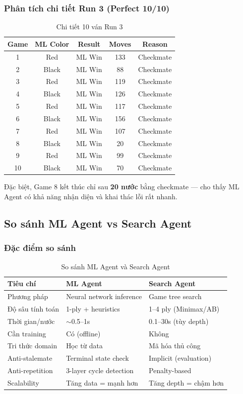 \subsubsection{Phân tích chi tiết Run 3 (Perfect 10/10)}
\begin{table}[H]
\centering
\caption{Chi tiết 10 ván Run 3}
\begin{tabular}{ccccc}
\toprule
\textbf{Game} & \textbf{ML Color} & \textbf{Result} & \textbf{Moves} & \textbf{Reason} \\
\midrule
1 & Red & ML Win & 133 & Checkmate \\
2 & Black & ML Win & 88 & Checkmate \\
3 & Red & ML Win & 119 & Checkmate \\
4 & Black & ML Win & 126 & Checkmate \\
5 & Red & ML Win & 117 & Checkmate \\
6 & Black & ML Win & 156 & Checkmate \\
7 & Red & ML Win & 107 & Checkmate \\
8 & Black & ML Win & 20 & Checkmate \\
9 & Red & ML Win & 99 & Checkmate \\
10 & Black & ML Win & 70 & Checkmate \\
\bottomrule
\end{tabular}
\end{table}

Đặc biệt, Game 8 kết thúc chỉ sau \textbf{20 nước} bằng checkmate --- cho thấy ML Agent có khả năng nhận diện và khai thác lỗi rất nhanh.

\subsection{So sánh ML Agent vs Search Agent}

\subsubsection{Đặc điểm so sánh}
\begin{table}[H]
\centering
\caption{So sánh ML Agent và Search Agent}
\begin{tabularx}{\textwidth}{lXX}
\toprule
\textbf{Tiêu chí} & \textbf{ML Agent} & \textbf{Search Agent} \\
\midrule
Phương pháp & Neural network inference & Game tree search \\
Độ sâu tính toán & 1-ply + heuristics & 1--4 ply (Minimax/AB) \\
Thời gian/nước & $\sim$0.5--1s & 0.1--30s (tùy depth) \\
Cần training & Có (offline) & Không \\
Tri thức domain & Học từ data & Mã hóa thủ công \\
Anti-stalemate & Terminal state check & Implicit (evaluation) \\
Anti-repetition & 3-layer cycle detection & Penalty-based \\
Scalability & Tăng data = mạnh hơn & Tăng depth = chậm hơn \\
\bottomrule
\end{tabularx}
\end{table}


